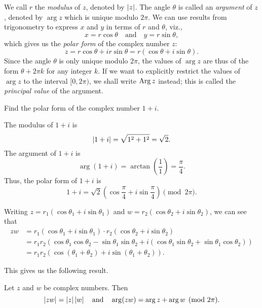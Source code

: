 We call \(r\) the \emph{modulus} of \(z\), denoted by \(\left\lvert z \right\rvert\). The angle \(\theta\) is called an \emph{argument} of \(z\), denoted by \(\arg z\) which is unique modulo \(2\pi\). We can use results from trigonometry to express \(x\) and \(y\) in terms of \(r\) and \(\theta\), viz.,
\[
    x = r\cos\theta \quad \text{and} \quad y = r\sin\theta,
\]
which gives us the \emph{polar form} of the complex number \(z\):
\[
    z = r\cos\theta + ir\sin\theta = r(\cos\theta + i\sin\theta).
\]
Since the angle \(\theta\) is only unique modulo \(2\pi\), the values of \(\arg z\) are thus of the form \(\theta + 2\pi k\) for any integer \(k\). If we want to explicitly restrict the values of \(\arg z\) to the interval \([0, 2\pi)\), we shall write \(\operatorname{Arg} z\) instead; this is called the \emph{principal value} of the argument.

\begin{example}
    Find the polar form of the complex number \(1 + i\).

    \begin{solution}
        The modulus of \(1 + i\) is
        \[
            \left\lvert 1 + i \right\rvert = \sqrt{1^2 + 1^2} = \sqrt{2}.
        \]
        The argument of \(1 + i\) is
        \[
            \arg(1 + i) = \arctan\left(\frac{1}{1}\right) = \frac{\pi}{4}.
        \]
        Thus, the polar form of \(1 + i\) is
        \[
            1 + i = \sqrt{2}\left(\cos\frac{\pi}{4} + i\sin\frac{\pi}{4}\right) \pmod{2\pi}.
        \]
    \end{solution}
\end{example}

Writing \(z = r_1(\cos\theta_1 + i\sin\theta_1)\) and \(w = r_2(\cos\theta_2 + i\sin\theta_2)\), we can see that
\begin{align}
    zw &= r_1(\cos\theta_1 + i\sin\theta_1) \cdot r_2(\cos\theta_2 + i\sin\theta_2) \nonumber \\
    &= r_1r_2(\cos\theta_1\cos\theta_2 - \sin\theta_1\sin\theta_2 + i(\cos\theta_1\sin\theta_2 + \sin\theta_1\cos\theta_2)) \nonumber \\
    &= r_1r_2(\cos(\theta_1 + \theta_2) + i\sin(\theta_1 + \theta_2)) \label{eq:product-polar}.
\end{align}

This gives us the following result.

\begin{theorem}
    Let \(z\) and \(w\) be complex numbers. Then
    \[
        \left\lvert zw \right\rvert = \left\lvert z \right\rvert\left\lvert w \right\rvert \quad \text{and} \quad \arg(zw) = \arg z + \arg w \pmod{2\pi}.
    \]
    \label{thm:product-polar}
\end{theorem}

